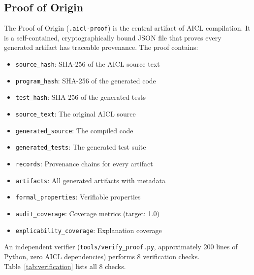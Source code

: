 \documentclass[11pt]{article}
\newcommand{\aicl}{\textsc{AICL}}
\newcommand{\proofoforigin}{Proof of Origin}
\begin{document}
\subsection{Proof of Origin}
\label{sec:aicl:proof}

The \proofoforigin{} (\texttt{.aicl-proof}) is the central artifact of \aicl{} compilation. It is a self-contained, cryptographically bound JSON file that proves every generated artifact has traceable provenance. The proof contains:
\begin{itemize}[leftmargin=*,itemsep=1pt]
  \item \texttt{source\_hash}: SHA-256 of the \aicl{} source text
  \item \texttt{program\_hash}: SHA-256 of the generated code
  \item \texttt{test\_hash}: SHA-256 of the generated tests
  \item \texttt{source\_text}: The original \aicl{} source
  \item \texttt{generated\_source}: The compiled code
  \item \texttt{generated\_tests}: The generated test suite
  \item \texttt{records}: Provenance chains for every artifact
  \item \texttt{artifacts}: All generated artifacts with metadata
  \item \texttt{formal\_properties}: Verifiable properties
  \item \texttt{audit\_coverage}: Coverage metrics (target: 1.0)
  \item \texttt{explicability\_coverage}: Explanation coverage
\end{itemize}

An independent verifier (\texttt{tools/verify\_proof.py}, approximately 200 lines of Python, zero \aicl{} dependencies) performs 8 verification checks. Table~\ref{tab:verification} lists all 8 checks.
\end{document}
